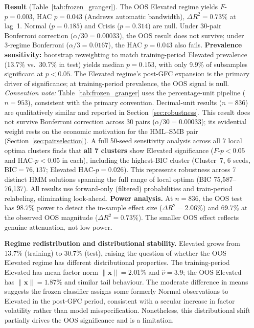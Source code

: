 \documentclass[sigconf,anonymous]{acmart}
\begin{document}
\textbf{Result} (Table~\ref{tab:frozen_granger}). The OOS Elevated regime yields
$F$-$p = 0.003$, HAC $p = 0.043$ (Andrews automatic bandwidth),
$\Delta R^2 = 0.73\%$ at lag~1. Normal ($p = 0.185$) and Crisis ($p = 0.314$) are null.
Under 30-pair Bonferroni correction ($\alpha/30 = 0.00033$), the OOS result does not
survive; under 3-regime Bonferroni ($\alpha/3 = 0.0167$), the HAC $p = 0.043$ also fails.
\textbf{Prevalence sensitivity:} bootstrap reweighting to match training-period
Elevated prevalence (13.7\% vs.\ 30.7\% in test) yields median $p = 0.153$,
with only 9.9\% of subsamples significant at $p < 0.05$.
The Elevated regime's post-GFC expansion is the primary driver of significance;
at training-period prevalence, the OOS signal is null.
\emph{Convention note:} Table~\ref{tab:frozen_granger} uses the percentage-unit
pipeline ($n = 953$), consistent with the primary convention.
Decimal-unit results ($n = 836$) are qualitatively similar and reported in
Section~\ref{sec:robustness}.
This result does not survive Bonferroni correction across 30 pairs
($\alpha/30 = 0.00033$); its evidential weight
rests on the economic motivation for the HML--SMB pair
(Section~\ref{sec:pairselection}).
A full 50-seed sensitivity analysis across all 7 local optima clusters finds that
\textbf{all 7 clusters} show Elevated significance ($F$-$p < 0.05$ and HAC-$p < 0.05$
in each), including the highest-BIC cluster (Cluster~7, 6 seeds, BIC$= 76{,}137$;
Elevated HAC-$p = 0.026$).
This represents robustness across 7 distinct HMM solutions spanning the full
range of local optima (BIC 75{,}587--76{,}137).
All results use forward-only (filtered) probabilities and train-period relabeling,
eliminating look-ahead.
\textbf{Power analysis.} At $n = 836$, the OOS test has 98.7\% power to detect
the in-sample effect size ($\Delta R^2 = 2.06\%$) and 69.7\% at the observed
OOS magnitude ($\Delta R^2 = 0.73\%$). The smaller OOS effect reflects genuine
attenuation, not low power.

\textbf{Regime redistribution and distributional stability.}
Elevated grows from 13.7\% (training) to 30.7\% (test), raising the question
of whether the OOS Elevated regime has different distributional properties.
The training-period Elevated has mean factor norm $\|\mathbf{x}\| = 2.01$\% and
$\hat{\nu} = 3.9$; the OOS Elevated has $\|\mathbf{x}\| = 1.87$\% and similar
tail behaviour. The moderate difference in means suggests the frozen classifier
assigns some formerly Normal observations to Elevated in the post-GFC period,
consistent with a secular increase in factor volatility rather than model
misspecification. Nonetheless, this distributional shift partially drives the OOS
significance and is a limitation.
\end{document}
